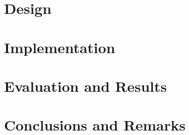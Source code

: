 \documentclass[logo,msc,cs]{infthesis}      %
\begin{document}
\chapter{Design}


\chapter{Implementation}


\chapter{Evaluation and Results}


\chapter{Conclusions and Remarks}






\appendix


\end{document}
